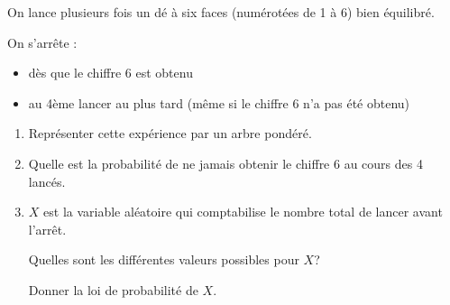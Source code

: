 
%
On lance plusieurs fois un dé à six faces (numérotées de 1 à 6) bien équilibré.
\par
On s'arrête :
\begin{itemize}
     \item
     dès que le chiffre 6 est obtenu
     \item
     au 4ème lancer au plus tard (même si le chiffre 6 n'a pas été obtenu)
\end{itemize}
\begin{enumerate}
     \item
     Représenter cette expérience par un arbre pondéré.
     \item
     Quelle est la probabilité de ne jamais obtenir le chiffre 6 au cours des 4 lancés.
     \item
     $X$ est la variable aléatoire qui comptabilise le nombre total de lancer avant l'arrêt.
     \par
     Quelles sont les différentes valeurs possibles pour $X$?
     \par
     Donner la loi de probabilité de $X$.
\end{enumerate}
